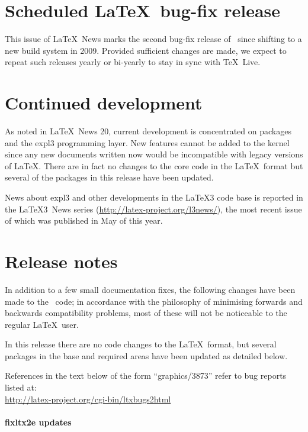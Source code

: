 \documentclass{ltnews}
\begin{document}
\maketitle

\section{Scheduled \LaTeX\ bug-fix release}

This issue of \LaTeX~News marks the second bug-fix release of
\LaTeXe\ since shifting to a new build system in 2009.
Provided sufficient changes are made, we expect to
repeat such releases yearly or bi-yearly to stay in sync with \TeX\ Live.

\section{Continued development}
As noted in \LaTeX\ News 20, current development is concentrated on
packages and the \textsf{expl3} programming layer.
New features cannot be added to the kernel since any new documents
written now would be incompatible with legacy versions of
\LaTeX. There are in fact no changes to the core code in the \LaTeX\ 
format but several of the packages in this release have been updated.

News about \textsf{expl3} and other developments in the \LaTeX3 code
base is reported in the \LaTeX3~News series
(\url{http://latex-project.org/l3news/}),
the most recent issue of which was published in
May of this year.

\section{Release notes}

In addition to a few small documentation fixes, the following changes
have been made to the \LaTeXe\ code; in accordance with the philosophy
of minimising forwards and backwards compatibility problems, most of
these will not be noticeable to the regular \LaTeX\ user. 

In this release there are no code changes to the \LaTeX\ format, but
several packages in the base and   required areas have been updated as
detailed below.

References in the text below of the form ``graphics/3873'' refer to
bug reports listed
at:\\ \url{http://latex-project.org/cgi-bin/ltxbugs2html}


\paragraph{\textsf{fixltx2e} updates}
\end{document}
